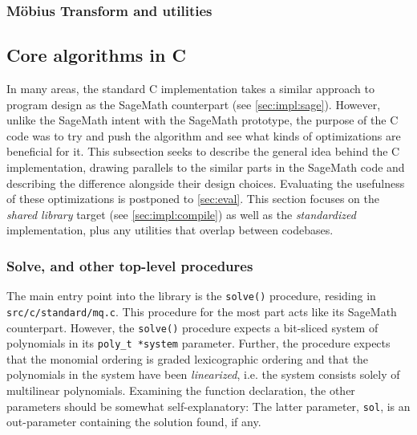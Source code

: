 \subsubsection{Möbius Transform and utilities}

\subsection{Core algorithms in C} \label{sec:impl:c}

In many areas, the standard C implementation takes a similar approach to program design as the SageMath counterpart (see \cref{sec:impl:sage}). However, unlike the SageMath intent with the SageMath prototype, the purpose of the C code was to try and push the algorithm and see what kinds of optimizations are beneficial for it. This subsection seeks to describe the general idea behind the C implementation, drawing parallels to the similar parts in the SageMath code and describing the difference alongside their design choices. Evaluating the usefulness of these optimizations is postponed to \cref{sec:eval}. This section focuses on the \textit{shared library} target (see \cref{sec:impl:compile}) as well as the \textit{standardized} implementation, plus any utilities that overlap between codebases.

\subsubsection{Solve, and other top-level procedures} \label{sec:impl:c:solve}

The main entry point into the library is the \texttt{solve()} procedure, residing in \texttt{src/c/standard/mq.c}. This procedure for the most part acts like its SageMath counterpart. However, the \texttt{solve()} procedure expects a bit-sliced system of polynomials in its \texttt{poly\_t *system} parameter. Further, the procedure expects that the monomial ordering is graded lexicographic ordering and that the polynomials in the system have been \textit{linearized}, i.e. the system consists solely of multilinear polynomials. Examining the function declaration, the other parameters should be somewhat self-explanatory:
The latter parameter, \texttt{sol}, is an out-parameter containing the solution found, if any.

